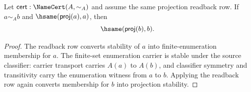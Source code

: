 \begin{theorem}
\label{thm:finset-projection-stable-readback-classifier-transport}
Let $\mathsf{cert}:\NameCert(A,\sim_A)$ and assume the same projection readback row. If $a\sim_A b$ and $\hsame(\mathsf{proj}(a),a)$, then
$$
\hsame(\mathsf{proj}(b),b).
$$
\end{theorem}
\begin{proof}
The readback row converts stability of $a$ into finite-enumeration membership for $a$. The finite-set enumeration carrier is stable under the source classifier: carrier transport carries $A(a)$ to $A(b)$, and classifier symmetry and transitivity carry the enumeration witness from $a$ to $b$. Applying the readback row again converts membership for $b$ into projection stability.
\end{proof}
